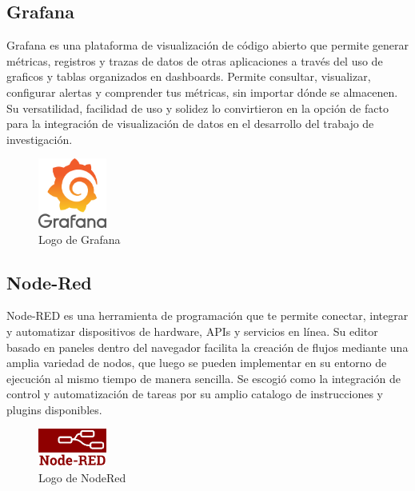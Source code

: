 \subsection{Grafana}
Grafana es una plataforma de visualización de código abierto que permite generar métricas, registros y trazas de datos de otras aplicaciones a través del uso de graficos y tablas organizados en dashboards. Permite consultar, visualizar, configurar alertas y comprender tus métricas, sin importar dónde se almacenen. Su versatilidad, facilidad de uso y solidez lo convirtieron en la opción de facto para la integración de visualización de datos en el desarrollo del trabajo de investigación.

\begin{figure}[ht]
\centering
\includegraphics[width=0.2\textwidth]{Figuras/Grafana_logo.png}
\caption{\label{fig:grafana-logo}Logo de Grafana}
\vspace*{-10pt}
\end{figure}

\subsection{Node-Red}
Node-RED es una herramienta de programación que te permite conectar, integrar y automatizar dispositivos de hardware, APIs y servicios en línea. Su editor basado en paneles dentro del navegador facilita la creación de flujos mediante una amplia variedad de nodos, que luego se pueden implementar en su entorno de ejecución al mismo tiempo de manera sencilla. Se escogió como la integración de control y automatización de tareas por su amplio catalogo de instrucciones y plugins disponibles. 
\begin{figure}[ht]
\centering
\includegraphics[width=0.2\textwidth]{Figuras/node_red_logo.png}
\caption{\label{fig:node-red-logo}Logo de NodeRed}
\vspace*{-10pt}
\end{figure}

